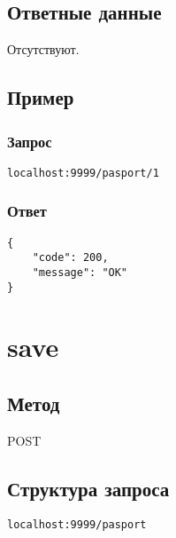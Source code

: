 \section*{Ответные данные}
Отсутствуют.

\section*{Пример}

\subsection*{Запрос}

\begin{lstlisting}
localhost:9999/pasport/1
\end{lstlisting}
\hfill

\subsection*{Ответ}

\begin{lstlisting}
{
	"code": 200,
	"message": "OK"
}
\end{lstlisting}
\hfill


\chapter{save}

\section*{Метод}
POST

\section*{Структура запроса}
\begin{lstlisting}
localhost:9999/pasport
\end{lstlisting}
\hfill

